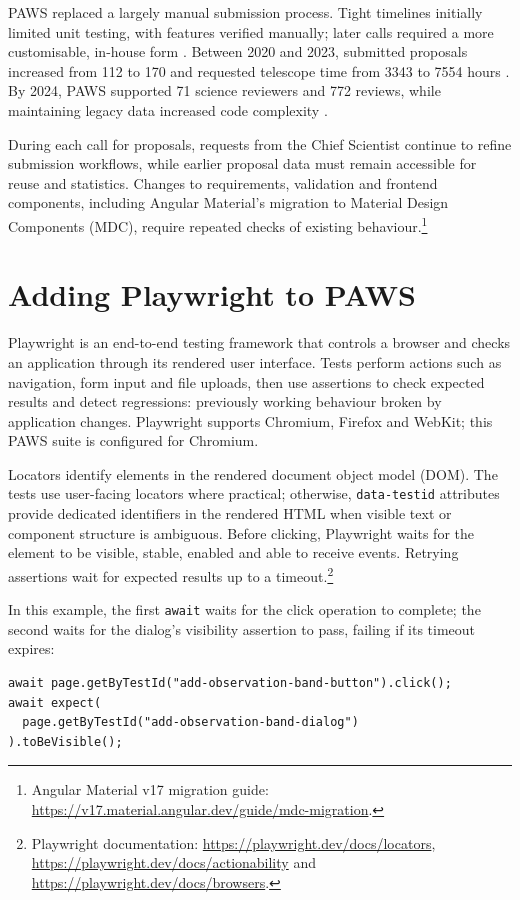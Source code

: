 \documentclass[11pt,twoside]{article}
\begin{document}
PAWS replaced a largely manual submission process. Tight timelines initially limited unit testing, with features verified manually; later calls required a more customisable, in-house form \citep{SchwartzBaloyiSithole2024PAWSSubmission}. Between 2020 and 2023, submitted proposals increased from 112 to 170 and requested telescope time from 3343 to 7554 hours \citep{SchwartzBaloyiSithole2024PAWSSubmission}. By 2024, PAWS supported 71 science reviewers and 772 reviews, while maintaining legacy data increased code complexity \citep{SchwartzBaloyi2024PAWSReview}.

During each call for proposals, requests from the Chief Scientist continue to refine submission workflows, while earlier proposal data must remain accessible for reuse and statistics. Changes to requirements, validation and frontend components, including Angular Material's migration to Material Design Components (MDC), require repeated checks of existing behaviour.\footnote{Angular Material v17 migration guide: \url{https://v17.material.angular.dev/guide/mdc-migration}.}

\section{Adding Playwright to PAWS}

Playwright is an end-to-end testing framework that controls a browser and checks an application through its rendered user interface. Tests perform actions such as navigation, form input and file uploads, then use assertions to check expected results and detect regressions: previously working behaviour broken by application changes. Playwright supports Chromium, Firefox and WebKit; this PAWS suite is configured for Chromium.

Locators identify elements in the rendered document object model (DOM). The tests use user-facing locators where practical; otherwise, \texttt{data-testid} attributes provide dedicated identifiers in the rendered HTML when visible text or component structure is ambiguous. Before clicking, Playwright waits for the element to be visible, stable, enabled and able to receive events. Retrying assertions wait for expected results up to a timeout.\footnote{Playwright documentation: \url{https://playwright.dev/docs/locators}, \url{https://playwright.dev/docs/actionability} and \url{https://playwright.dev/docs/browsers}.}

In this example, the first \texttt{await} waits for the click operation to complete; the second waits for the dialog's visibility assertion to pass, failing if its timeout expires:
\begin{verbatim}
await page.getByTestId("add-observation-band-button").click();
await expect(
  page.getByTestId("add-observation-band-dialog")
).toBeVisible();
\end{verbatim}
\end{document}
